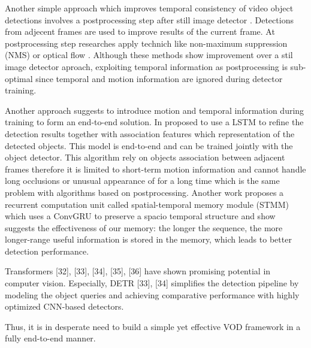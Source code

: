 


Another simple approach which improves temporal consistency of video object detections involves a postprocessing step after still image detector \cite{hanSeqNMSVideoObject2016, kangTCNNTubeletsConvolutional2018, kangObjectDetectionVideo2016}. Detections from adjecent frames are used to improve results of the current frame. At postprocessing step researches apply technich like non-maximum suppression (NMS) \cite{hanSeqNMSVideoObject2016} or optical flow \cite{kangTCNNTubeletsConvolutional2018, kangObjectDetectionVideo2016}. Although these methods show improvement over a stil image detector aproach, exploiting temporal information as postprocessing is sub-optimal since temporal and motion information are ignored during detector training.



Another approach suggests to introduce motion and temporal information during training to form an end-to-end solution. In \cite{Lu_2017_ICCV} proposed to use a LSTM \cite{6795963} to refine the detection results together with association features which representation of the detected objects. This model is end-to-end and can be trained jointly with the object detector. This algorithm rely on objects association between adjacent frames therefore it is limited to short-term motion information and cannot handle long occlusions or unusual appearance of for a long time which is the same problem with algorithms based on postprocessing. Another work proposes a recurrent computation unit called spatial-temporal memory module (STMM) \cite{xiaoVideoObjectDetection2018} which uses a ConvGRU \cite{ballasDelvingDeeperConvolutional2016} to preserve a spacio temporal structure and show suggests the effectiveness of our memory: the longer the sequence, the more longer-range useful information is stored in the memory, which leads to better detection performance.


Transformers [32], [33], [34], [35], [36] have shown promising potential in computer vision. Especially, DETR [33], [34] simplifies the detection pipeline by modeling the object queries and achieving comparative performance with highly optimized CNN-based detectors.

Thus, it is in desperate need to build a simple yet effective VOD framework in a fully end-to-end manner.

